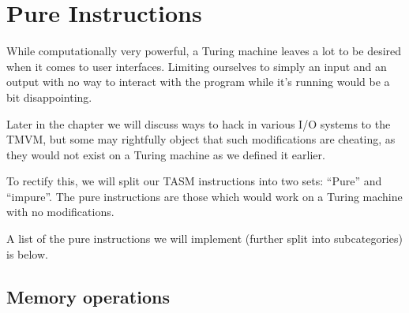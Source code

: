 \section {Pure Instructions}

While computationally very powerful, a Turing machine leaves a lot to be desired when it comes to user interfaces. Limiting ourselves to simply an input and an output with no way to interact with the program while it's running would be a bit disappointing.

Later in the chapter we will discuss ways to hack in various I/O systems to the TMVM, but some may rightfully object that such modifications are cheating, as they would not exist on a Turing machine as we defined it earlier.

To rectify this, we will split our TASM instructions into two sets: ``Pure'' and ``impure''. The pure instructions are those which would work on a Turing machine with no modifications.

A list of the pure instructions we will implement (further split into subcategories) is below.

\subsection{Memory operations}

